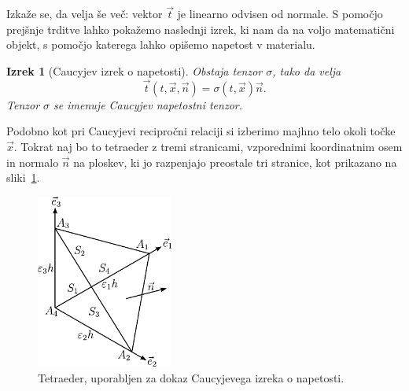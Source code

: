 \documentclass[a4paper,twoside]{article}
\theoremstyle{definition} %
\theoremstyle{plain} %
\newtheorem{izrek}[definicija]{Izrek}
\numberwithin{equation}{section}
\newcommand{\vt}{\vec{t}}
\newcommand{\vn}{\vec{n}}
\newcommand{\vx}{\vec{x}}
\newcommand{\ts}{\sigma}
\begin{document}
Izkaže se, da velja še več: vektor $\vt$ je linearno odvisen od normale. S
pomočjo prejšnje trditve lahko pokažemo naslednji izrek, ki nam da na voljo
matematični objekt, s pomočjo katerega lahko opišemo napetost v materialu.
\begin{izrek}[Caucyjev izrek o napetosti]
  Obstaja tenzor $\ts$, tako da velja \[
    \vt(t, \vx, \vn) = \ts(t, \vx)\vn.
  \]
  Tenzor $\ts$ se imenuje Caucyjev napetostni tenzor.
\end{izrek}
\proof
Podobno kot pri Caucyjevi recipročni relaciji si izberimo majhno telo okoli
točke $\vx$. Tokrat naj bo to tetraeder z tremi stranicami, vzporednimi
koordinatnim osem in normalo $\vn$ na ploskev, ki jo razpenjajo preostale tri
stranice, kot prikazano na sliki~\ref{fig:tetra}.

\begin{figure}[h]
  \centering
  \includegraphics[width=0.4\textwidth]{images/cauchy_tetrahedron.pdf}
  \caption{Tetraeder, uporabljen za dokaz Caucyjevega izreka o napetosti.}
  \label{fig:tetra}
\end{figure}
\end{document}
